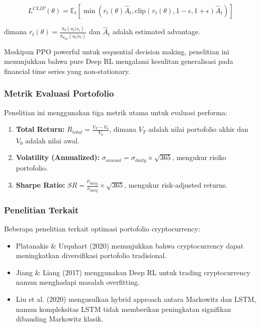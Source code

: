 \documentclass[12pt,a4paper]{article}
\begin{document}
\begin{equation}
L^{CLIP}(\theta) = \mathbb{E}_t[\min(r_t(\theta)\hat{A}_t, \text{clip}(r_t(\theta), 1-\epsilon, 1+\epsilon)\hat{A}_t)]
\end{equation}

dimana $r_t(\theta) = \frac{\pi_\theta(a_t|s_t)}{\pi_{\theta_{old}}(a_t|s_t)}$ dan $\hat{A}_t$ adalah estimated advantage.

Meskipun PPO powerful untuk sequential decision making, penelitian ini menunjukkan bahwa pure Deep RL mengalami kesulitan generalisasi pada financial time series yang non-stationary.

\subsubsection{Metrik Evaluasi Portofolio}

Penelitian ini menggunakan tiga metrik utama untuk evaluasi performa:

\begin{enumerate}
    \item \textbf{Total Return:} $R_{total} = \frac{V_T - V_0}{V_0}$, dimana $V_T$ adalah nilai portofolio akhir dan $V_0$ adalah nilai awal.
    
    \item \textbf{Volatility (Annualized):} $\sigma_{annual} = \sigma_{daily} \times \sqrt{365}$, mengukur risiko portofolio.
    
    \item \textbf{Sharpe Ratio:} $SR = \frac{\mu_{daily}}{\sigma_{daily}} \times \sqrt{365}$, mengukur risk-adjusted returns.
\end{enumerate}

\subsubsection{Penelitian Terkait}

Beberapa penelitian terkait optimasi portofolio cryptocurrency:

\begin{itemize}
    \item Platanakis \& Urquhart (2020) \cite{platanakis2020portfolio} menunjukkan bahwa cryptocurrency dapat meningkatkan diversifikasi portofolio tradisional.
    
    \item Jiang \& Liang (2017) \cite{jiang2017cryptocurrency} menggunakan Deep RL untuk trading cryptocurrency namun menghadapi masalah overfitting.
    
    \item Liu et al. (2020) \cite{liu2020portfolio} mengusulkan hybrid approach antara Markowitz dan LSTM, namun kompleksitas LSTM tidak memberikan peningkatan signifikan dibanding Markowitz klasik.
\end{itemize}
\end{document}
